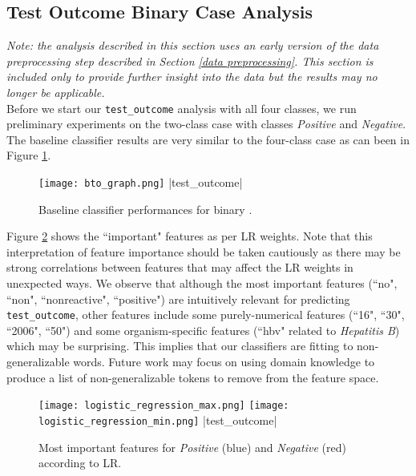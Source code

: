 \documentclass[11pt]{article}
\begin{document}
\newpage


\subsection{Test Outcome Binary Case Analysis} \label{test outcome binary case analysis}

\noindent \textit{Note: the analysis described in this section uses an early version of the data preprocessing step described in Section \ref{data preprocessing}. This section is included only to provide further insight into the data but the results may no longer be applicable.}
\\

Before we start our \verb|test_outcome| analysis with all four classes, we run preliminary experiments on the two-class case with classes \textit{Positive} and \textit{Negative}. The baseline classifier results are very similar to the four-class case as can been in Figure \ref{binary test outcome figure}.
\\

\begin{figure}[H]
    \centering
    \texttt{[image: bto\_graph.png]}
    |test_outcome|
    \caption{Baseline classifier performances for binary \protect{}.}
    \label{binary test outcome figure}
\end{figure}

Figure \ref{binary test outcome lr figure} shows the ``important" features as per LR weights. Note that this interpretation of feature importance should be taken cautiously as there may be strong correlations between features that may affect the LR weights in unexpected ways. We observe that although the most important features (``no", ``non", ``nonreactive", ``positive") are intuitively relevant for predicting \verb|test_outcome|, other features include some purely-numerical features (``16", ``30", ``2006", ``50") and some organism-specific features (``hbv" related to \textit{Hepatitis B}) which may be surprising. This implies that our classifiers are fitting to non-generalizable words. Future work may focus on using domain knowledge to produce a list of non-generalizable tokens to remove from the feature space.
\\

\begin{figure}[H]
    \centering
    \texttt{[image: logistic\_regression\_max.png]}
    \texttt{[image: logistic\_regression\_min.png]}
    |test_outcome|
    \caption{Most important features for \textit{Positive} (blue) and \textit{Negative} (red) \protect{} according to LR.}
    \label{binary test outcome lr figure}
\end{figure}
\end{document}
